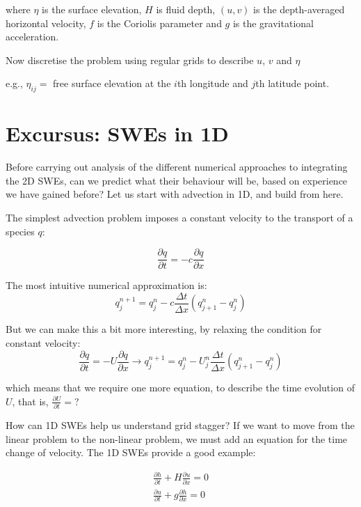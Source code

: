 where $\eta$ is the surface elevation, $H$ is fluid depth, $(u,v)$ is
the depth-averaged horizontal velocity, $f$ is the Coriolis parameter
and $g$ is the gravitational acceleration. 

Now discretise the problem using regular grids to describe $u$, $v$ and $\eta$ 

e.g., $\eta_{ij}=$ free surface elevation at the $i$th longitude and $j$th
latitude point.

\section{Excursus: SWEs in 1D}

Before carrying out analysis of the different numerical approaches to integrating the 2D SWEs, can we predict what their behaviour will be, based on experience we have gained before? Let us start with advection in 1D, and build from here.

The simplest advection problem imposes a constant velocity to the transport of a species $q$:

\begin{equation}
	\frac{\partial q}{\partial t} = - c \frac{\partial q}{\partial x} 
\end{equation}

The most intuitive numerical approximation is:
\begin{equation}
	q_j^{n+1} = q_j^n - c \frac {\Delta t}{\Delta x} (q_{j+1}^n - q_j^n)
\end{equation}

But we can make this a bit more interesting, by relaxing the condition for constant velocity:
\begin{equation}
	\frac{\partial q}{\partial t} = - U \frac{\partial q}{\partial x}  \rightarrow  q_j^{n+1} = q_j^n - U_j^n \frac {\Delta t}{\Delta x} (q_{j+1}^n - q_j^n)
\end{equation}

which means that we require one more equation, to describe the time evolution of $U$, that is, $\frac{\partial U}{\partial t} = ?$

How can 1D SWEs help us understand grid stagger? If we want to move from the linear problem to the non-linear problem, we must add an equation for the time change of velocity. The 1D SWEs provide a good example:

\begin{eqnarray}
	\frac{\partial h}{\partial t} + H \frac{\partial u}{\partial x} = 0 \\
	\frac {\partial u}{\partial t} + g \frac{\partial h}{\partial x} = 0 \nonumber
\label{eqn:SWEs-1d}
\end{eqnarray}

